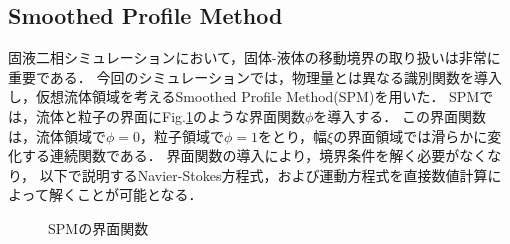 \subsection{Smoothed Profile Method}
固液二相シミュレーションにおいて，固体-液体の移動境界の取り扱いは非常に重要である．
今回のシミュレーションでは，物理量とは異なる識別関数を導入し，仮想流体領域を考えるSmoothed Profile Method(SPM)\cite{}を用いた．
SPMでは，流体と粒子の界面にFig.\ref{spm_function}のような界面関数$\phi$を導入する．
この界面関数は，流体領域で$\phi=0$，粒子領域で$\phi=1$をとり，幅$\xi$の界面領域では滑らかに変化する連続関数である．
界面関数の導入により，境界条件を解く必要がなくなり，
以下で説明するNavier-Stokes方程式，および運動方程式を直接数値計算によって解くことが可能となる．
    \begin{figure}[htbp]
        \label{spm_function}
        \caption{SPMの界面関数}
    \end{figure}

